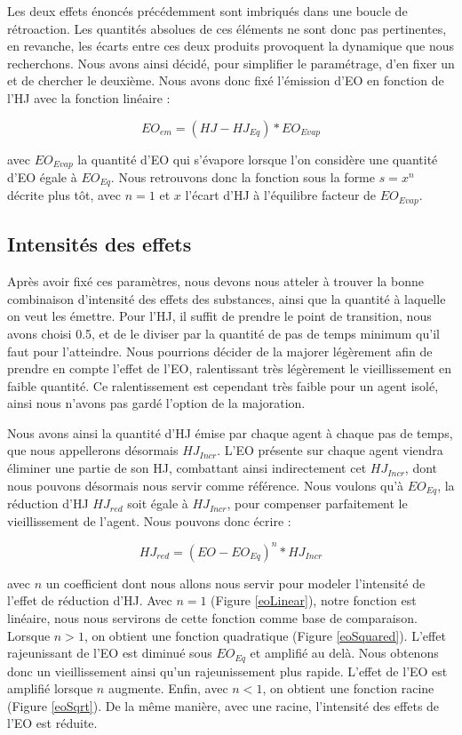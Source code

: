 	Les deux effets énoncés précédemment sont imbriqués dans une boucle de rétroaction. Les quantités absolues de ces éléments ne sont donc pas pertinentes, en revanche, les écarts entre ces deux produits provoquent la dynamique que nous recherchons. Nous avons ainsi décidé, pour simplifier le paramétrage, d'en fixer un et de chercher le deuxième. Nous avons donc fixé l'émission d'EO en fonction de l'HJ avec la fonction linéaire :
	
	\begin{equation}
		EO_{em} = (HJ - HJ_{Eq}) * EO_{Evap}
	\label{eoEM}
	\end{equation}

avec $EO_{Evap}$ la quantité d'EO qui s'évapore lorsque l'on considère une quantité d'EO égale à $EO_{Eq}$. Nous retrouvons donc la fonction sous la forme $s=x^n$ décrite plus tôt, avec $n = 1$ et $x$ l'écart d'HJ à l'équilibre facteur de $EO_{Evap}$.
	
	
	\subsection{Intensités des effets}	
	Après avoir fixé ces paramètres, nous devons nous atteler à trouver la bonne combinaison d'intensité des effets des substances, ainsi que la quantité à laquelle on veut les émettre. Pour l'HJ, il suffit de prendre le point de transition, nous avons choisi 0.5, et de le diviser par la quantité de pas de temps minimum qu'il faut pour l'atteindre. Nous pourrions décider de la majorer légèrement afin de prendre en compte l'effet de l'EO, ralentissant très légèrement le vieillissement en faible quantité. Ce ralentissement est cependant très faible pour un agent isolé, ainsi nous n'avons pas gardé l'option de la majoration.
	
	Nous avons ainsi la quantité d'HJ émise par chaque agent à chaque pas de temps, que nous appellerons désormais $HJ_{Incr}$. L'EO présente sur chaque agent viendra éliminer une partie de son HJ, combattant ainsi indirectement cet $HJ_{Incr}$, dont nous pouvons désormais nous servir comme référence. Nous voulons qu'à $EO_{Eq}$, la réduction d'HJ $HJ_{red}$ soit égale à $HJ_{Incr}$, pour compenser parfaitement le vieillissement de l'agent. Nous pouvons donc écrire :
	
	\begin{equation}
		 HJ_{red} = (EO - EO_{Eq})^n * HJ_{Incr}
	\label{hjRED}
	\end{equation}
	
	avec $n$ un coefficient dont nous allons nous servir pour modeler l'intensité de l'effet de réduction d'HJ. Avec $n=1$ (Figure \ref{eoLinear}), notre fonction est linéaire, nous nous servirons de cette fonction comme base de comparaison. Lorsque $n>1$, on obtient une fonction quadratique (Figure \ref{eoSquared}). L'effet rajeunissant de l'EO est diminué sous $EO_{Eq}$ et amplifié au delà. Nous obtenons donc un vieillissement ainsi qu'un rajeunissement plus rapide. L'effet de l'EO est amplifié lorsque $n$ augmente. Enfin, avec $n < 1$, on obtient une fonction racine (Figure \ref{eoSqrt}). De la même manière, avec une racine, l'intensité des effets de l'EO est réduite.
	
